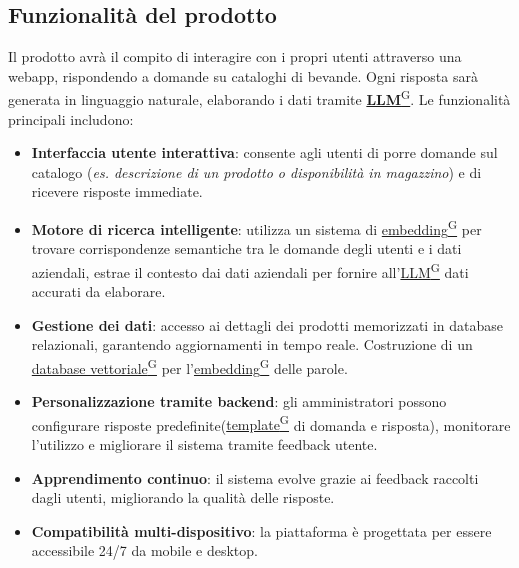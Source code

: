 \subsection{Funzionalità del prodotto}
Il prodotto avrà il compito di interagire con i propri utenti attraverso una webapp, rispondendo a domande su cataloghi di bevande. Ogni risposta sarà generata in linguaggio naturale, elaborando i dati tramite \href{https://code7crusaders.github.io/docs/PB/documentazione_interna/glossario.html#llm-large-language-model}{\textbf{LLM}\textsuperscript{G}}. Le funzionalità principali includono:
\begin{itemize}
    \item \textbf{Interfaccia utente interattiva}: consente agli utenti di porre domande sul catalogo (\textit{es. descrizione di un prodotto o disponibilità in magazzino}) e di ricevere risposte immediate.
    \item \textbf{Motore di ricerca intelligente}: utilizza un sistema di \href{https://code7crusaders.github.io/docs/PB/documentazione_interna/glossario.html#embedding}{embedding\textsuperscript{G}} per trovare corrispondenze semantiche tra le domande degli utenti e i dati aziendali, estrae il contesto dai dati aziendali per fornire all'\href{https://code7crusaders.github.io/docs/PB/documentazione_interna/glossario.html#llm-large-language-model}{LLM\textsuperscript{G}} dati accurati da elaborare.
    \item \textbf{Gestione dei dati}: accesso ai dettagli dei prodotti memorizzati in database relazionali, garantendo aggiornamenti in tempo reale. Costruzione di un \href{https://code7crusaders.github.io/docs/PB/documentazione_interna/glossario.html#database-vettoriale}{database vettoriale\textsuperscript{G}} per l'\href{https://code7crusaders.github.io/docs/PB/documentazione_interna/glossario.html#embedding}{embedding\textsuperscript{G}} delle parole.
    \item \textbf{Personalizzazione tramite backend}: gli amministratori possono configurare risposte predefinite(\href{https://code7crusaders.github.io/docs/PB/documentazione_interna/glossario.html#template}{template\textsuperscript{G}} di domanda e risposta), monitorare l’utilizzo e migliorare il sistema tramite feedback utente.
    \item \textbf{Apprendimento continuo}: il sistema evolve grazie ai feedback raccolti dagli utenti, migliorando la qualità delle risposte.
    \item \textbf{Compatibilità multi-dispositivo}: la piattaforma è progettata per essere accessibile 24/7 da mobile e desktop.
\end{itemize}

